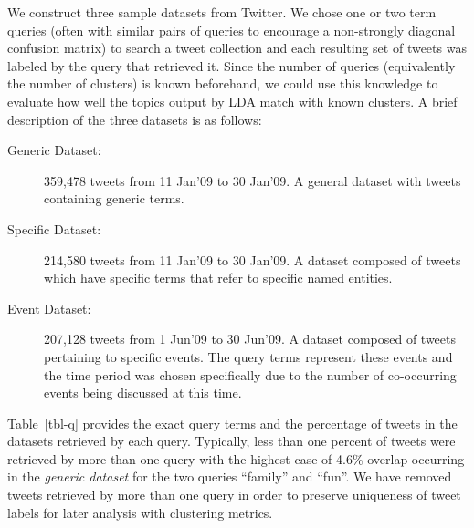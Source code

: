 \documentclass{sig-alternate}
\begin{document}
We construct three sample datasets from Twitter.
We chose one or two term queries (often
with similar pairs of queries to encourage a non-strongly diagonal
confusion matrix) to search a tweet collection and each resulting set
of tweets was labeled by the query that retrieved it.  Since the
number of queries (equivalently the number of clusters) is known
beforehand, we could use this knowledge to evaluate how well the
topics output by LDA match with known clusters. A brief description of
the three datasets is as follows:
\begin{description}
\item[Generic Dataset: ] 359,478 tweets from 11 Jan'09 to 30 Jan'09.  A
  general dataset with tweets containing generic terms.\vspace{-5pt}
\item[Specific Dataset: ] 214,580 tweets from 11 Jan'09 to 30 Jan'09.
  A dataset composed of tweets which have specific terms that refer to
  specific named entities.\vspace{-5pt}
\item[Event Dataset: ] 207,128 tweets from 1 Jun'09 to 30 Jun'09.  A
  dataset composed of tweets pertaining to specific events.  The query
  terms represent these events and the time period was chosen
  specifically due to the number of co-occurring events being
  discussed at this time.
\end{description}

Table~\ref{tbl-q} provides the exact query terms and the percentage of
tweets in the datasets retrieved by each query.  Typically, less than
one percent of tweets were retrieved by more than one query with the
highest case of 4.6\% overlap occurring in the \emph{generic dataset}
for the two queries ``family'' and ``fun''.  We have removed tweets
retrieved by more than one query in order to preserve
uniqueness of tweet labels for later analysis with clustering metrics.
\end{document}
